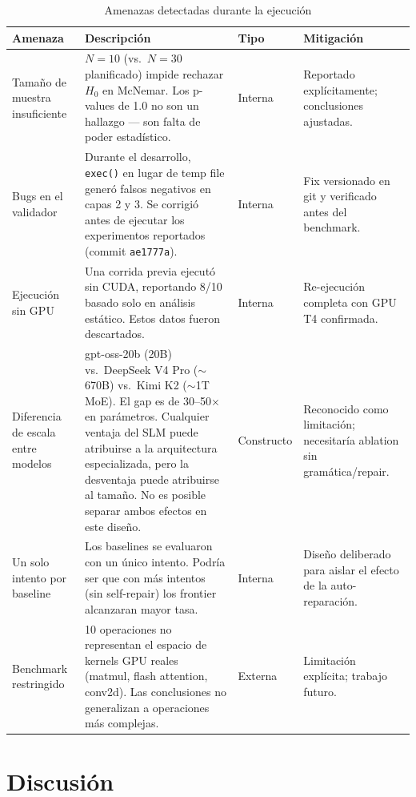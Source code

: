 \documentclass[12pt]{article}
\begin{document}
\begin{table}[H]
\centering
\caption{Amenazas detectadas durante la ejecución}
\begin{tabular}{p{2.8cm}p{5.5cm}p{1.5cm}p{3cm}}
\toprule
\textbf{Amenaza} & \textbf{Descripción} & \textbf{Tipo} & \textbf{Mitigación} \\
\midrule
Tamaño de muestra insuficiente &
  $N=10$ (vs.\ $N=30$ planificado) impide rechazar $H_0$ en McNemar.
  Los p-values de 1.0 no son un hallazgo — son falta de poder estadístico. &
  Interna &
  Reportado explícitamente; conclusiones ajustadas. \\
\midrule
Bugs en el validador &
  Durante el desarrollo, \texttt{exec()} en lugar de temp file generó falsos
  negativos en capas 2 y 3. Se corrigió antes de ejecutar los experimentos
  reportados (commit \texttt{ae1777a}). &
  Interna &
  Fix versionado en git y verificado antes del benchmark. \\
\midrule
Ejecución sin GPU &
  Una corrida previa ejecutó sin CUDA, reportando 8/10 basado solo en análisis
  estático. Estos datos fueron descartados. &
  Interna &
  Re-ejecución completa con GPU T4 confirmada. \\
\midrule
Diferencia de escala entre modelos &
  gpt-oss-20b (20B) vs.\ DeepSeek V4 Pro ($\sim$670B) vs.\ Kimi K2 ($\sim$1T MoE).
  El gap es de 30--50$\times$ en parámetros. Cualquier ventaja del SLM puede
  atribuirse a la arquitectura especializada, pero la desventaja puede atribuirse
  al tamaño. No es posible separar ambos efectos en este diseño. &
  Constructo &
  Reconocido como limitación; necesitaría ablation sin gramática/repair. \\
\midrule
Un solo intento por baseline &
  Los baselines se evaluaron con un único intento. Podría ser que con más intentos
  (sin self-repair) los frontier alcanzaran mayor tasa. &
  Interna &
  Diseño deliberado para aislar el efecto de la auto-reparación. \\
\midrule
Benchmark restringido &
  10 operaciones no representan el espacio de kernels GPU reales (matmul, flash
  attention, conv2d). Las conclusiones no generalizan a operaciones más complejas. &
  Externa &
  Limitación explícita; trabajo futuro. \\
\bottomrule
\end{tabular}
\end{table}

\section{Discusión}
\end{document}
